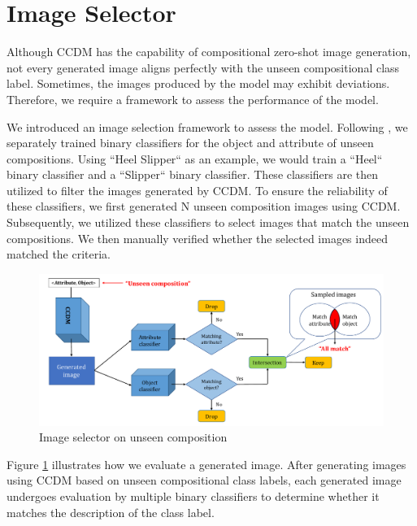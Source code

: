 \section{Image Selector}
\label{sec:selector}
Although CCDM has the capability of compositional zero-shot image generation, not every generated image aligns perfectly with the unseen compositional class label. Sometimes, the images produced by the model may exhibit deviations. Therefore, we require a framework to assess the performance of the model.

 We introduced an image selection framework to assess the model. Following \cite{misra2017red}, we separately trained binary classifiers for the object and attribute of unseen compositions. Using ``Heel Slipper`` as an example, we would train a ``Heel`` binary classifier and a ``Slipper`` binary classifier. These classifiers are then utilized to filter the images generated by CCDM.
To ensure the reliability of these classifiers, we first generated N unseen composition images using CCDM. Subsequently, we utilized these classifiers to select images that match the unseen compositions. We then manually verified whether the selected images indeed matched the criteria.
\begin{figure} [H]
    \centering
    \includegraphics[width=1\linewidth]{figures/Image selector.pdf}
    \caption{Image selector on unseen composition}
    \label{fig:selection}
\end{figure}

Figure \ref{fig:selection} illustrates how we evaluate a generated image. After generating images using CCDM based on unseen compositional class labels, each generated image undergoes evaluation by multiple binary classifiers to determine whether it matches the description of the class label. 

